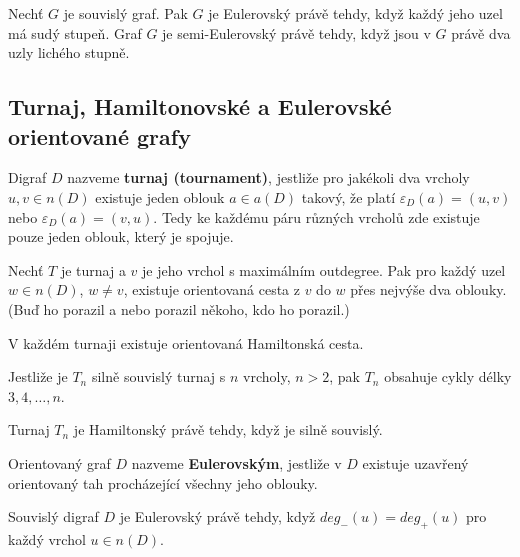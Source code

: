 \begin{theorem}
Nechť $G$ je souvislý graf. Pak $G$ je Eulerovský právě tehdy, když každý jeho uzel má sudý stupeň. Graf $G$ je semi-Eulerovský právě tehdy, když jsou v $G$ právě dva uzly lichého stupně.
\end{theorem}

\subsection{Turnaj, Hamiltonovské a Eulerovské orientované grafy}

\begin{definition}
Digraf $D$ nazveme \textbf{turnaj (tournament)}, jestliže pro jakékoli dva vrcholy $u, v \in n(D)$ existuje jeden oblouk $a \in a(D)$ takový, že platí $\varepsilon_D (a) = (u,v)$ nebo $\varepsilon_D (a) = (v,u)$. Tedy ke každému páru různých vrcholů zde existuje pouze jeden oblouk, který je spojuje.
\end{definition}

\begin{theorem}
Nechť $T$ je turnaj a $v$ je jeho vrchol s maximálním outdegree. Pak pro každý uzel $w \in n(D)$, $w \neq v$, existuje orientovaná cesta z $v$ do $w$ přes nejvýše dva oblouky. (Buď ho porazil a nebo porazil někoho, kdo ho porazil.)
\end{theorem}

\begin{theorem}
V každém turnaji existuje orientovaná Hamiltonská cesta.
\end{theorem}

\begin{theorem}
Jestliže je $T_n$ silně souvislý turnaj s $n$ vrcholy, $n >2$, pak $T_n$ obsahuje cykly délky $3,4, \ldots, n$.
\end{theorem}

\begin{theorem}
Turnaj $T_n$ je Hamiltonský právě tehdy, když je silně souvislý.
\end{theorem}

\begin{definition}
Orientovaný graf $D$ nazveme \textbf{Eulerovským}, jestliže v $D$ existuje uzavřený orientovaný tah procházející všechny jeho oblouky.
\end{definition}

\begin{theorem}
Souvislý digraf $D$ je Eulerovský právě tehdy, když $deg_- (u) = deg_+(u)$ pro každý vrchol $u \in n(D)$.
\end{theorem}

